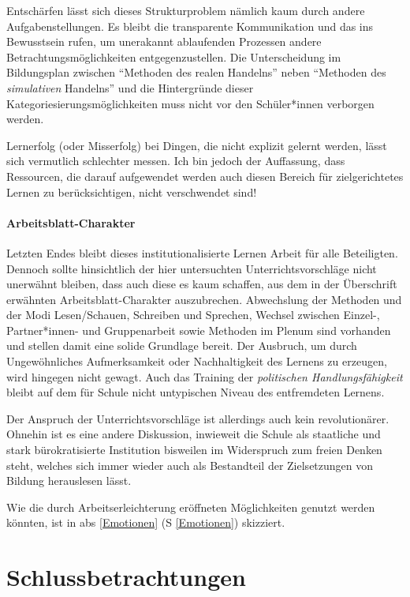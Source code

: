 Entschärfen lässt sich dieses Strukturproblem nämlich kaum durch andere Aufgabenstellungen. Es bleibt die transparente Kommunikation und das ins Bewusstsein rufen, um unerakannt ablaufenden Prozessen andere Betrachtungsmöglichkeiten entgegenzustellen. 
Die Unterscheidung im Bildungsplan zwischen \enquote{Methoden des realen Handelns} \autocite[13]{bplan} neben \enquote{Methoden des \emph{simulativen} Handelns} \autocite[14]{bplan} und die Hintergründe dieser Kategoriesierungsmöglichkeiten muss nicht vor den Schüler*innen verborgen werden. 
\bigskip

Lernerfolg (oder Misserfolg) bei Dingen, die nicht explizit gelernt werden, lässt sich vermutlich schlechter messen. Ich bin jedoch der Auffassung, dass Ressourcen, die darauf aufgewendet werden auch diesen Bereich für zielgerichtetes Lernen zu berücksichtigen, nicht verschwendet sind! 


\paragraph{Arbeitsblatt-Charakter}
Letzten Endes bleibt dieses institutionalisierte Lernen Arbeit für alle Beteiligten. Dennoch sollte hinsichtlich der hier untersuchten Unterrichtsvorschläge nicht unerwähnt bleiben, dass auch diese es kaum schaffen, aus dem in der Überschrift erwähnten Arbeitsblatt-Charakter auszubrechen. Abwechslung der Methoden und der Modi Lesen/Schauen, Schreiben und Sprechen, Wechsel zwischen Einzel-, Partner*innen- und Gruppenarbeit sowie Methoden im Plenum sind vorhanden und stellen damit eine solide Grundlage bereit. Der Ausbruch, um durch Ungewöhnliches Aufmerksamkeit oder Nachhaltigkeit des Lernens zu erzeugen, wird hingegen nicht gewagt. 
Auch das Training der \emph{politischen Handlungsfähigkeit} bleibt auf dem für Schule nicht untypischen Niveau des entfremdeten Lernens. 

Der Anspruch der Unterrichtsvorschläge ist allerdings auch kein revolutionärer. Ohnehin ist es eine andere Diskussion, inwieweit die Schule als staatliche und stark bürokratisierte Institution bisweilen im Widerspruch zum freien Denken steht, welches sich immer wieder auch als Bestandteil der Zielsetzungen von Bildung herauslesen lässt. 

Wie die durch Arbeitserleichterung eröffneten Möglichkeiten genutzt werden könnten, ist in \gls{abs} \ref{Emotionen} (\gls{S} \ref{Emotionen}) skizziert. 



\section{Schlussbetrachtungen}
